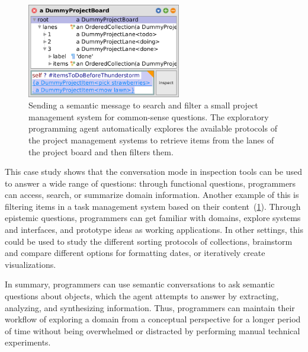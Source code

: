 \begin{figure}
	\centering
	\includegraphics[width=0.6\textwidth]{chapters/08_application/02_conversation/project.png}
	\caption[Sending a semantic message to search and filter a small project management system for common-sense questions.]{
		Sending a semantic message to search and filter a small project management system for common-sense questions.
		The exploratory programming agent automatically explores the available protocols of the project management systems to retrieve items from the lanes of the project board and then filters them.
	}
	\label{fig:application/conversation/project}
\end{figure}

This case study shows that the conversation mode in inspection tools can be used to answer a wide range of questions:
through functional questions, programmers can access, search, or summarize domain information.
Another example of this is filtering items in a task management system based on their content~(\cref{fig:application/conversation/project}).
Through epistemic questions, programmers can get familiar with domains, explore systems and interfaces, and prototype ideas as working applications.
In other settings, this could be used to study the different sorting protocols of collections, brainstorm and compare different options for formatting dates, or iteratively create visualizations.

In summary, programmers can use semantic conversations to ask semantic questions about objects, which the agent attempts to answer by extracting, analyzing, and synthesizing information.
Thus, programmers can maintain their workflow of exploring a domain from a conceptual perspective for a longer period of time without being overwhelmed or distracted by performing manual technical experiments.
